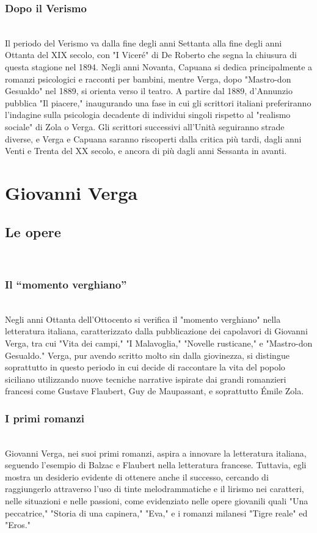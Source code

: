 \documentclass{report}
\begin{document}
\subsubsection{Dopo il Verismo}
\\
Il periodo del Verismo va dalla fine degli anni Settanta alla fine degli anni Ottanta del XIX secolo, con "I Viceré" di De Roberto che segna la chiusura di questa stagione nel 1894. Negli anni Novanta, Capuana si dedica principalmente a romanzi psicologici e racconti per bambini, mentre Verga, dopo "Mastro-don Gesualdo" nel 1889, si orienta verso il teatro. A partire dal 1889, d'Annunzio pubblica "Il piacere," inaugurando una fase in cui gli scrittori italiani preferiranno l'indagine sulla psicologia decadente di individui singoli rispetto al "realismo sociale" di Zola o Verga. Gli scrittori successivi all'Unità seguiranno strade diverse, e Verga e Capuana saranno riscoperti dalla critica più tardi, dagli anni Venti e Trenta del XX secolo, e ancora di più dagli anni Sessanta in avanti.
\\
\section{Giovanni Verga}
\subsection{Le opere}
\\
\subsubsection{Il “momento verghiano”}
\\
Negli anni Ottanta dell'Ottocento si verifica il "momento verghiano" nella letteratura italiana, caratterizzato dalla pubblicazione dei capolavori di Giovanni Verga, tra cui "Vita dei campi," "I Malavoglia," "Novelle rusticane," e "Mastro-don Gesualdo." Verga, pur avendo scritto molto sin dalla giovinezza, si distingue soprattutto in questo periodo in cui decide di raccontare la vita del popolo siciliano utilizzando nuove tecniche narrative ispirate dai grandi romanzieri francesi come Gustave Flaubert, Guy de Maupassant, e soprattutto Émile Zola.
\\
\subsubsection{I primi romanzi}
\\
Giovanni Verga, nei suoi primi romanzi, aspira a innovare la letteratura italiana, seguendo l'esempio di Balzac e Flaubert nella letteratura francese. Tuttavia, egli mostra un desiderio evidente di ottenere anche il successo, cercando di raggiungerlo attraverso l'uso di tinte melodrammatiche e il lirismo nei caratteri, nelle situazioni e nelle passioni, come evidenziato nelle opere giovanili quali "Una peccatrice," "Storia di una capinera," "Eva," e i romanzi milanesi "Tigre reale" ed "Eros."
\\
\end{document}
